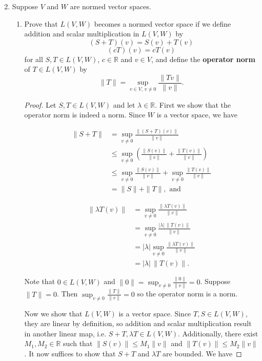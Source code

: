 \documentclass[11pt,oneside,english]{amsart}
\theoremstyle{definition}
\newcommand{\MB}[1]{\mathbb{#1}}
\begin{document}
\begin{enumerate}
\setcounter{enumi}{1}

\item Suppose $V$ and $W$ are normed vector spaces.

\begin{enumerate}
\itemsep7mm

\item Prove that $L(V,W)$ becomes a normed vector space if we define addition and scalar multiplication in $L(V,W)$ by
\[         (S + T)(v) = S(v) + T(v)   \]
\[        (c T)(v) = c T(v)   \]
for all $S,T \in L(V,W)$, $c \in \MB{R}$ and $v \in V$, and define the \textbf{operator norm}  of $T \in L(V,W)$ by 
\[        \|T\| = \sup_{v \in V, \, v \neq 0} \frac{\|Tv\|}{\|v\|}    .\]

\begin{proof}
Let $S,T \in L(V,W)$ and let $\lambda\in \MB{R}$. First we show that the operator norm is indeed a norm. Since $W$ is a vector space, we have

\begin{multicols}{2}
\begin{align*}
\|S+T\|&=\sup_{v\neq0}\frac{\|(S+T)(v)\|}{\|v\|}\\[2mm]
&\leq\sup_{v\neq0}\left(\frac{\|S(v)\|}{\|v\|}+\frac{\|T(v)\|}{\|v\|}\right)\\[2mm]
&\leq\sup_{v\neq0}\frac{\|S(v)\|}{\|v\|}+\sup_{v\neq0}\frac{\|T(v)\|}{\|v\|}\\[2mm]
&=\|S\|+\|T\|,\text{ and}
\end{align*}


\begin{align*}
\|\lambda T(v)\|&=\sup_{v\neq0}\frac{\|\lambda T(v)\|}{\|v\|}\\[2mm]
&=\sup_{v\neq0}\frac{|\lambda|\,\|T(v)\|}{\|v\|}\\[2mm]
&=|\lambda|\sup_{v\neq0}\frac{\|\lambda T(v)\|}{\|v\|}\\[2mm]
&=|\lambda|\,\|T(v)\|.
\end{align*}
\end{multicols}

Note that $0\in L(V,W)$ and $\|0\|=\sup_{v\neq0}\frac{\|0\|}{\|v\|}=0$. Suppose $\|T\|=0$. Then $\sup_{v\neq0}\frac{\|T\|}{\|v\|}=0$ so the operator norm is a norm. 

Now we show that $L(V,W)$ is a vector space. Since $T,S\in L(V,W)$, they are linear by definition, so addition and scalar multiplication result in another linear map, i.e. $S+T,\lambda T\in L(V,W)$. Additionally, there exist $M_1,M_2\in \MB{R}$ such that $\|S(v)\|\leq M_1\|v\|$ and $\|T(v)\|\leq M_2\|v\|$. It now suffices to show that $S+T$ and $\lambda T$ are bounded. We have


\end{proof}
\end{enumerate}
\end{enumerate}
\end{document}
